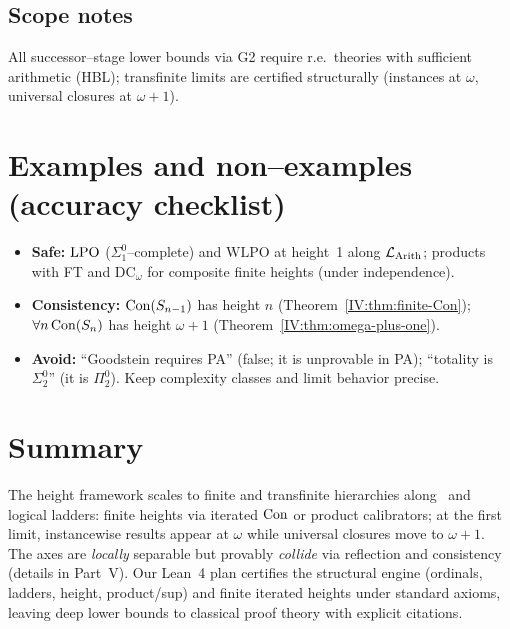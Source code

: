 \documentclass[11pt]{article}
\theoremstyle{definition}
\theoremstyle{remark}
\newcommand{\WLPO}{\mathrm{WLPO}}
\begin{document}
\subsection*{Scope notes}
All successor–stage lower bounds via G2 require r.e.\ theories with sufficient arithmetic (HBL); transfinite limits are certified structurally (instances at $\omega$, universal closures at $\omega{+}1$).

\section{Examples and non--examples (accuracy checklist)}

\begin{itemize}
\item \textbf{Safe:} $\mathrm{LPO}$ (\(\Sigma^0_1\)–complete) and $\WLPO$ at height~1 along \(\mathcal{L}_{\mathrm{Arith}}\); products with FT and $\mathrm{DC}_\omega$ for composite finite heights (under independence).
\item \textbf{Consistency:} $\mathrm{Con}(S_{n-1})$ has height $n$ (Theorem~\ref{IV:thm:finite-Con}); $\forall n\,\mathrm{Con}(S_n)$ has height $\omega{+}1$ (Theorem~\ref{IV:thm:omega-plus-one}).
\item \textbf{Avoid:} “Goodstein requires PA” (false; it is unprovable in PA); “totality is $\Sigma^0_2$” (it is $\Pi^0_2$). Keep complexity classes and limit behavior precise.
\end{itemize}

\section{Summary}

The height framework scales to finite and transfinite hierarchies along \LCons\ and logical ladders:
finite heights via iterated $\mathrm{Con}$ or product calibrators; at the first limit, instancewise results appear at $\omega$ while universal closures move to $\omega{+}1$. The axes are \emph{locally} separable but provably \emph{collide} via reflection and consistency (details in Part~V). Our Lean~4 plan certifies the structural engine (ordinals, ladders, height, product/sup) and finite iterated heights under standard axioms, leaving deep lower bounds to classical proof theory with explicit citations.
\end{document}
